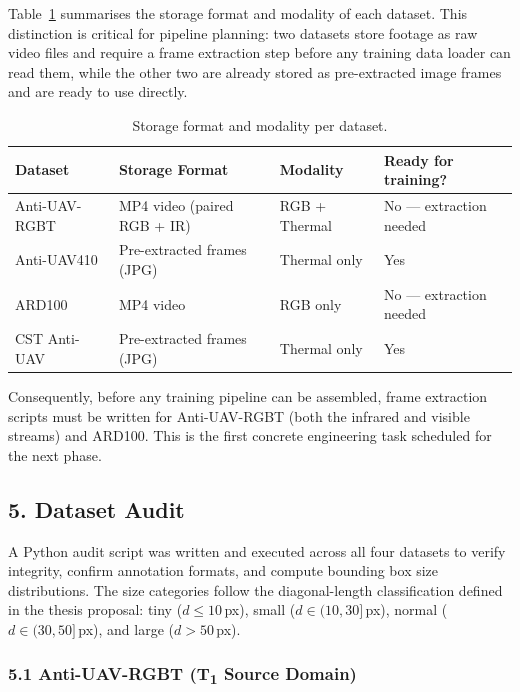 Table~\ref{tab:storage} summarises the storage format and modality of
each dataset. This distinction is critical for pipeline planning: two
datasets store footage as raw video files and require a frame extraction
step before any training data loader can read them, while the other two
are already stored as pre-extracted image frames and are ready to use
directly.

\begin{table}[h]
\centering
\caption{Storage format and modality per dataset.}
\label{tab:storage}
\begin{tabular}{llll}
\hline
Dataset & Storage Format & Modality & Ready for training? \\
\hline
Anti-UAV-RGBT  & MP4 video (paired RGB + IR) & RGB + Thermal & No — extraction needed \\
Anti-UAV410    & Pre-extracted frames (JPG)  & Thermal only  & Yes \\
ARD100         & MP4 video                   & RGB only      & No — extraction needed \\
CST Anti-UAV   & Pre-extracted frames (JPG)  & Thermal only  & Yes \\
\hline
\end{tabular}
\end{table}

\noindent Consequently, before any training pipeline can be assembled,
frame extraction scripts must be written for Anti-UAV-RGBT (both the
infrared and visible streams) and ARD100. This is the first concrete
engineering task scheduled for the next phase.

\subsection*{5. Dataset Audit}

A Python audit script was written and executed across all four datasets
to verify integrity, confirm annotation formats, and compute bounding
box size distributions. The size categories follow the diagonal-length
classification defined in the thesis proposal: tiny
($d \leq 10$\,px), small ($d \in (10, 30]$\,px),
normal ($d \in (30, 50]$\,px), and large ($d > 50$\,px).

\subsubsection*{5.1 Anti-UAV-RGBT (T\textsubscript{1} Source Domain)}

